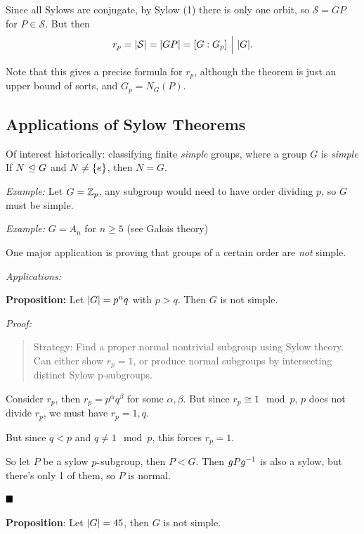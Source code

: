 Since all Sylows are conjugate, by Sylow (1) there is only one orbit, so
\(\mathcal S = GP\) for \(P \in \mathcal S\). But then
\begin{align*}
r_p = {\left\lvert {\mathcal S} \right\rvert} = {\left\lvert {GP} \right\rvert} = [G: G_p] {~\Bigm| ~} {\left\lvert {G} \right\rvert}.
\end{align*}

Note that this gives a precise formula for \(r_p\), although the theorem
is just an upper bound of sorts, and \(G_p = N_G(P)\).

\hypertarget{applications-of-sylow-theorems}{%
\subsection{Applications of Sylow
Theorems}\label{applications-of-sylow-theorems}}

Of interest historically: classifying finite \emph{simple} groups, where
a group \(G\) is \emph{simple} If \(N {~\trianglelefteq~} G\) and
\(N \neq \left\{{e}\right\}\), then \(N=G\).

\emph{Example:} Let \(G = {\mathbb{Z}}_p\), any subgroup would need to have order
dividing \(p\), so \(G\) must be simple.

\emph{Example:} \(G = A_n\) for \(n\geq 5\) (see Galois theory)

One major application is proving that groups of a certain order are
\emph{not} simple.

\emph{Applications:}

\textbf{Proposition:} Let \({\left\lvert {G} \right\rvert} = p^n q\) with \(p > q\). Then \(G\)
is not simple.

\emph{Proof:}

\begin{quote}
Strategy: Find a proper normal nontrivial subgroup using Sylow theory.
Can either show \(r_p = 1\), or produce normal subgroups by intersecting
distinct Sylow p-subgroups.
\end{quote}

Consider \(r_p\), then \(r_p = p^\alpha q^\beta\) for some
\(\alpha, \beta\). But since \(r_p \cong 1 \mod p\), \(p\) does not
divide \(r_p\), we must have \(r_p = 1, q\).

But since \(q < p\) and \(q\neq 1 \mod p\), this forces \(r_p = 1\).

So let \(P\) be a sylow \(p{\hbox{-}}\)subgroup, then \(P < G\). Then
\(gPg^{-1}\) is also a sylow, but there's only 1 of them, so \(P\) is
normal.

\(\qed\)

\textbf{Proposition}: Let \({\left\lvert {G} \right\rvert} = 45\), then \(G\) is not simple.

